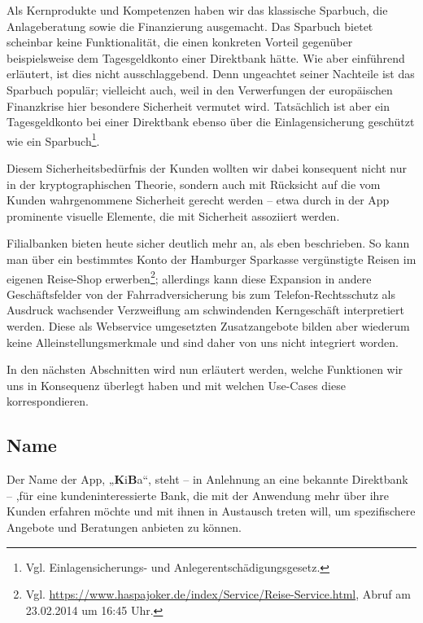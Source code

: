 	Als Kernprodukte und Kompetenzen haben wir das klassische Sparbuch, die Anlageberatung sowie die Finanzierung ausgemacht. Das Sparbuch bietet scheinbar keine Funktionalität, die einen konkreten Vorteil gegenüber beispielsweise dem Tagesgeldkonto einer Direktbank hätte. Wie aber einführend erläutert, ist dies nicht ausschlaggebend. Denn ungeachtet seiner Nachteile ist das Sparbuch populär; vielleicht auch, weil in den Verwerfungen der europäischen Finanzkrise hier besondere Sicherheit vermutet wird. Tatsächlich ist aber ein Tagesgeldkonto bei einer Direktbank ebenso über die Einlagensicherung geschützt wie ein Sparbuch\footnote{Vgl. Einlagensicherungs- und Anlegerentschädigungsgesetz.}.

	Diesem Sicherheitsbedürfnis der Kunden wollten wir dabei konsequent nicht nur in der kryptographischen Theorie, sondern auch mit Rücksicht auf die vom Kunden wahrgenommene Sicherheit gerecht werden – etwa durch in der App prominente visuelle Elemente, die mit Sicherheit assoziiert werden.

	Filialbanken bieten heute sicher deutlich mehr an, als eben beschrieben. So kann man über ein bestimmtes Konto der Hamburger Sparkasse vergünstigte Reisen im eigenen Reise-Shop erwerben\footnote{Vgl. \url{https://www.haspajoker.de/index/Service/Reise-Service.html}, Abruf am 23.02.2014 um 16:45 Uhr.}; allerdings kann diese Expansion in andere Geschäftsfelder von der Fahrradversicherung bis zum Telefon-Rechtsschutz als Ausdruck wachsender Verzweiflung am schwindenden Kerngeschäft interpretiert werden. Diese als Webservice umgesetzten Zusatzangebote bilden aber wiederum keine Alleinstellungsmerkmale und sind daher von uns nicht integriert worden.

	In den nächsten Abschnitten wird nun erläutert werden, welche Funktionen wir uns in Konsequenz überlegt haben und mit welchen Use-Cases diese korrespondieren.

\subsection{Name}
    Der Name der App, „\textbf{K}i\textbf{B}a“, steht – in Anlehnung an eine bekannte Direktbank – ,für eine kundeninteressierte Bank, die mit der Anwendung mehr über ihre Kunden erfahren möchte und mit ihnen in Austausch treten will, um spezifischere Angebote und Beratungen anbieten zu können.
    
